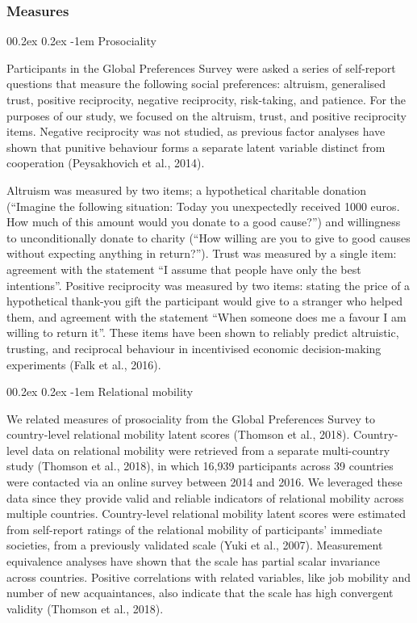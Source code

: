 \documentclass[english,man,floatsintext]{apa6}
\makeatletter
\renewcommand{\paragraph}{\@startsection{paragraph}{4}{\parindent}%
  {0\baselineskip \@plus 0.2ex \@minus 0.2ex}%
  {-1em}%
  {\normalfont\normalsize\bfseries\itshape\typesectitle}}
\makeatother
\begin{document}
\hypertarget{measures}{%
\subsubsection{Measures}\label{measures}}

\hypertarget{prosociality}{%
\paragraph{Prosociality}\label{prosociality}}

Participants in the Global Preferences Survey were asked a series of self-report questions that measure the following social preferences: altruism, generalised trust, positive reciprocity, negative reciprocity, risk-taking, and patience. For the purposes of our study, we focused on the altruism, trust, and positive reciprocity items. Negative reciprocity was not studied, as previous factor analyses have shown that punitive behaviour forms a separate latent variable distinct from cooperation (Peysakhovich et al., 2014).

Altruism was measured by two items; a hypothetical charitable donation (\enquote{Imagine the following situation: Today you unexpectedly received 1000 euros. How much of this amount would you donate to a good cause?}) and willingness to unconditionally donate to charity (\enquote{How willing are you to give to good causes without expecting anything in return?}). Trust was measured by a single item: agreement with the statement \enquote{I assume that people have only the best intentions}. Positive reciprocity was measured by two items: stating the price of a hypothetical thank-you gift the participant would give to a stranger who helped them, and agreement with the statement \enquote{When someone does me a favour I am willing to return it}. These items have been shown to reliably predict altruistic, trusting, and reciprocal behaviour in incentivised economic decision-making experiments (Falk et al., 2016).

\hypertarget{relational-mobility}{%
\paragraph{Relational mobility}\label{relational-mobility}}

We related measures of prosociality from the Global Preferences Survey to country-level relational mobility latent scores (Thomson et al., 2018). Country-level data on relational mobility were retrieved from a separate multi-country study (Thomson et al., 2018), in which 16,939 participants across 39 countries were contacted via an online survey between 2014 and 2016. We leveraged these data since they provide valid and reliable indicators of relational mobility across multiple countries. Country-level relational mobility latent scores were estimated from self-report ratings of the relational mobility of participants' immediate societies, from a previously validated scale (Yuki et al., 2007). Measurement equivalence analyses have shown that the scale has partial scalar invariance across countries. Positive correlations with related variables, like job mobility and number of new acquaintances, also indicate that the scale has high convergent validity (Thomson et al., 2018).
\end{document}
